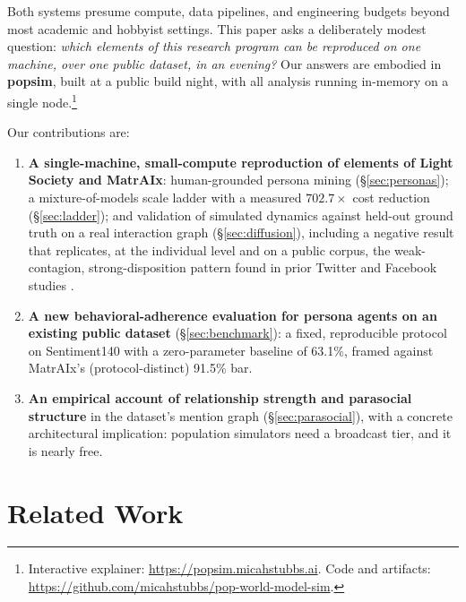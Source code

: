 \documentclass[twocolumn,10pt]{article}
\makeatletter
\newcommand{\paperurlof}[1]{\csname paperurl@#1\endcsname}
\newcommand{\ecite}[1]{\href{\paperurlof{#1}}{\NoHyper\cite{#1}\endNoHyper}}
\makeatother
\begin{document}
Both systems presume compute, data pipelines, and engineering budgets beyond
most academic and hobbyist settings. This paper asks a deliberately modest
question: \emph{which elements of this research program can be reproduced on
one machine, over one public dataset, in an evening?} Our answers are embodied
in \textbf{popsim}, built at a public build night, with all analysis running
in-memory on a single node.\footnote{Interactive explainer:
\url{https://popsim.micahstubbs.ai}. Code and artifacts:
\url{https://github.com/micahstubbs/pop-world-model-sim}.}

Our contributions are:
\begin{enumerate}
  \item \textbf{A single-machine, small-compute reproduction of elements of
  Light Society and MatrAIx}: human-grounded persona mining (\S\ref{sec:personas});
  a mixture-of-models scale ladder with a measured $702.7\times$ cost reduction
  (\S\ref{sec:ladder}); and validation of simulated dynamics against held-out
  ground truth on a real interaction graph (\S\ref{sec:diffusion}), including a
  negative result that replicates, at the individual level and on a public
  corpus, the weak-contagion, strong-disposition pattern found in prior
  Twitter and Facebook studies \ecite{ferrara2015}\ecite{kramer2014}\ecite{charlton2016}.
  \item \textbf{A new behavioral-adherence evaluation for persona agents on an
  existing public dataset} (\S\ref{sec:benchmark}): a fixed, reproducible
  protocol on Sentiment140 with a zero-parameter baseline of 63.1\%, framed
  against MatrAIx's (protocol-distinct) 91.5\% bar.
  \item \textbf{An empirical account of relationship strength and parasocial
  structure} in the dataset's mention graph (\S\ref{sec:parasocial}),
  with a concrete architectural implication: population simulators need a
  broadcast tier, and it is nearly free.
\end{enumerate}

\section{Related Work}
\end{document}
